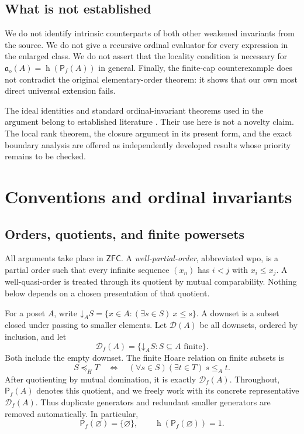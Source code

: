 \documentclass[11pt,letterpaper]{article}
\theoremstyle{teal}
\theoremstyle{definition}
\newcommand{\Pf}{\mathsf P_{\!f}}
\newcommand{\Df}{\mathcal D_{\!f}}
\newcommand{\Down}{\mathcal D}
\newcommand{\hgt}{\operatorname{h}}
\newcommand{\ao}{\mathfrak a_o}
\newcommand{\dn}{\mathord\downarrow}
\newcommand{\ZFC}{\mathsf{ZFC}}
\begin{document}
\subsection{What is not established}
We do not identify intrinsic counterparts of both other weakened invariants from the source. We do not give a recursive ordinal evaluator for every expression in the enlarged class. We do not assert that the locality condition is necessary for $\ao(A)=\hgt(\Pf(A))$ in general. Finally, the finite-cap counterexample does not contradict the original elementary-order theorem: it shows that our own most direct universal extension fails.

The ideal identities and standard ordinal-invariant theorems used in the argument belong to established literature \cite{IdealApproach,DSS,deJonghParikh}. Their use here is not a novelty claim. The local rank theorem, the closure argument in its present form, and the exact boundary analysis are offered as independently developed results whose priority remains to be checked.

\section{Conventions and ordinal invariants}
\subsection{Orders, quotients, and finite powersets}
All arguments take place in $\ZFC$. A \emph{well-partial-order}, abbreviated wpo, is a partial order such that every infinite sequence $(x_n)$ has $i<j$ with $x_i\leq x_j$. A well-quasi-order is treated through its quotient by mutual comparability. Nothing below depends on a chosen presentation of that quotient.

For a poset $A$, write $\dn_A S=\{x\in A:(\exists s\in S)\ x\leq s\}$. A downset is a subset closed under passing to smaller elements. Let $\Down(A)$ be all downsets, ordered by inclusion, and let
\[
 \Df(A)=\{\dn_A S:S\subseteq A\text{ finite}\}.
\]
Both include the empty downset. The finite Hoare relation on finite subsets is
\[
 S\preceq_H T\quad\Longleftrightarrow\quad
 (\forall s\in S)(\exists t\in T)\ s\leq_A t.
\]
After quotienting by mutual domination, it is exactly $\Df(A)$. Throughout, $\Pf(A)$ denotes this quotient, and we freely work with its concrete representative $\Df(A)$. Thus duplicate generators and redundant smaller generators are removed automatically. In particular,
\[
 \Pf(\varnothing)=\{\varnothing\},\qquad
 \hgt(\Pf(\varnothing))=1.
\]
\end{document}
